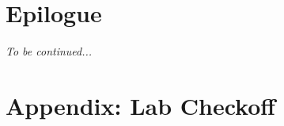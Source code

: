 
\section*{Epilogue}

%
%

\textit{To be continued...}

\newpage

\section*{Appendix: Lab Checkoff}


